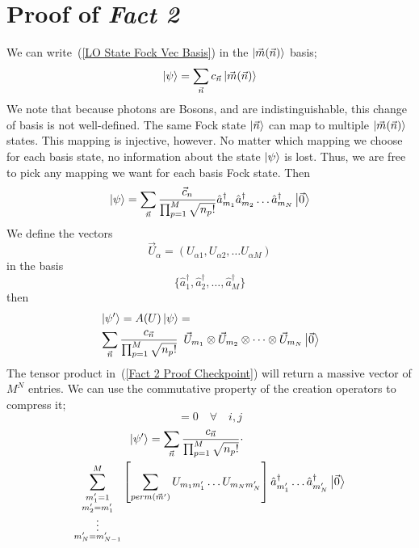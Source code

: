 \documentclass[aps,pra,twocolumn,showpacs,superscriptaddress,floatfix,10pt]{revtex4}
\begin{document}
\section{Proof of \textit{Fact 2}}
\label{Proof of Fact 2}
We can write~(\ref{LO State Fock Vec Basis}) in the $\ket{\vec{m}(\vec{n})}$ basis;
\begin{equation}
\ket{\psi} = \sum_{\vec{n}} c_{\vec{n}} \ket{\vec{m}(\vec{n})}
\end{equation}
We note that because photons are Bosons, and are indistinguishable, this change of basis is not well-defined. The same Fock state $\ket{\vec{n}}$ can map to multiple $\ket{\vec{m}(\vec{n})}$ states. This mapping is injective, however. No matter which mapping we choose for each basis state, no information about the state $\ket{\psi}$ is lost. Thus, we are free to pick any mapping we want for each basis Fock state. Then
\begin{equation}
\ket{\psi} = \sum_{\vec{n}} \frac{\vec{c}_n}{\prod_{p=1}^{M} \sqrt{n_p !}} \hat{a}_{m_1}^\dagger \hat{a}_{m_2}^\dagger \dots \hat{a}_{m_N}^\dagger \ket{\vec{0}}
\end{equation}
We define the vectors
\begin{equation}
\vec{U}_\alpha = (U_{\alpha 1},U_{\alpha 2},\dots U_{\alpha M})
\end{equation}
in the basis
\begin{equation}
\{ \hat{a}_{1}^\dagger,\hat{a}_{2}^\dagger, \dots, \hat{a}_{M}^\dagger \}
\end{equation}
then
\begin{eqnarray}
\label{Fact 2 Proof Checkpoint}
& \ket{\psi^\prime} = A(U) \ket{\psi} =  \quad \quad \quad \quad \quad \quad \quad \quad \quad \quad \\ & \nonumber
\sum_{\vec{n}} \frac{c_{\vec{n}}}{\prod_{p=1}^{M} \sqrt{n_p !}} \enspace \vec{U}_{m_1} \otimes \vec{U}_{m_2} \otimes \dots \otimes \vec{U}_{m_N} \ket{\vec{0}}
\end{eqnarray}
The tensor product in~(\ref{Fact 2 Proof Checkpoint}) will return a massive vector of $M^N$ entries. We can use the commutative property of the creation operators to compress it;
\begin{equation}
[\hat{a}_i ^ \dagger,\hat{a}_j ^ \dagger] = 0 \quad \forall \quad i,j
\end{equation}
\begin{eqnarray}
 \ket{\psi^\prime} = \sum_{\vec{n}} \frac{c_{\vec{n}}}{\prod_{p=1}^{M} \sqrt{n_p !}} \cdot \quad \quad \quad \quad \quad \quad \quad \quad \quad \\  \nonumber \sum^M_{\substack{m_1^\prime = 1\\
		m_2^\prime = m_1^\prime\\
		\vdots \\
		m_N^\prime = m_{N-1}^\prime}}
\left[ \sum_{perm(\vec{m}^\prime)} U_{m_1 m_1^\prime} \dots U_{m_N m_N^\prime} \right] \hat{a}_{m_1^\prime}^\dagger \dots \hat{a}_{m_N^\prime}^\dagger \ket{\vec{0}}
\end{eqnarray}
\end{document}
